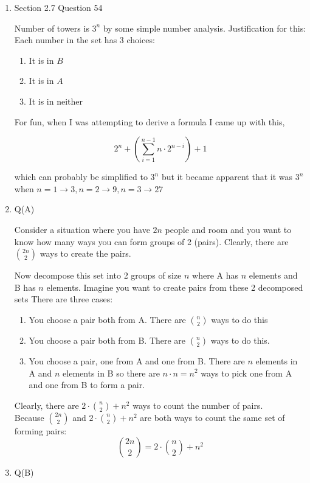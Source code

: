 \documentclass[12pt]{exam}
\begin{document}
\begin{enumerate}
\item Section 2.7 Question 54

Number of towers is $3^n$ by some simple number analysis. Justification for this: Each number in the set has 3 choices: \begin{enumerate}
    \item It is in $B$
    \item It is in $A$
    \item It is in neither
\end{enumerate}

For fun, when I was attempting to derive a formula I came up with this, 

$$2^n + (\sum_{i = 1}^{n - 1} n \cdot 2^{n - i}) + 1$$ 

which can probably be simplified to $3^n$ but it became apparent that it was $3^n$ when $n = 1 \rightarrow 3, n = 2 \rightarrow 9, n = 3 \rightarrow 27$

\item Q(A)

Consider a situation where you have $2n$ people and room and you want to know how many ways you can form groups of 2 (pairs). Clearly, there are $\binom{2n}{2}$ ways to create the pairs. 

Now decompose this set into 2 groups of size $n$ where A has $n$ elements and B has $n$ elements. Imagine you want to create pairs from these 2 decomposed sets There are three cases:

\begin{enumerate}
    \item You choose a pair both from A. There are $\binom{n}{2}$ ways to do this
    \item You choose a pair both from B. There are $\binom{n}{2}$ ways to do this.
    \item You choose a pair, one from A and one from B. There are $n$ elements in A and $n$ elements in B so there are $n \cdot n = n^2$ ways to pick one from A and one from B to form a pair. 
\end{enumerate}

Clearly, there are $2 \cdot \binom{n}{2} + n^2$ ways to count the number of pairs. \\

Because $\binom{2n}{2}$ and $2 \cdot \binom{n}{2} + n^2$ are both ways to count the same set of forming pairs: $$\binom{2n}{2} = 2 \cdot \binom{n}{2} + n^2$$

\item Q(B)


\end{enumerate}
\end{document}

